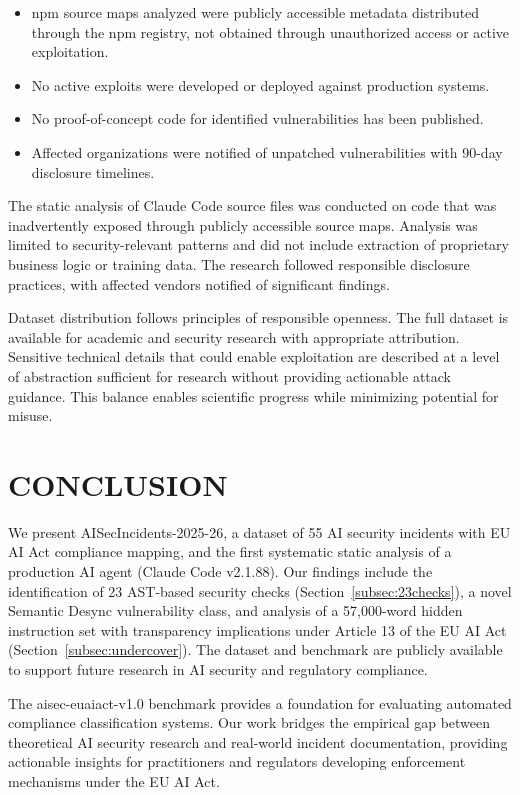\documentclass[10pt,conference]{IEEEtran}
\begin{document}
\begin{itemize}
    \item npm source maps analyzed were publicly accessible metadata distributed through the npm registry, not obtained through unauthorized access or active exploitation.
    \item No active exploits were developed or deployed against production systems.
    \item No proof-of-concept code for identified vulnerabilities has been published.
    \item Affected organizations were notified of unpatched vulnerabilities with 90-day disclosure timelines.
\end{itemize}

The static analysis of Claude Code source files was conducted on code that was inadvertently exposed through publicly accessible source maps. Analysis was limited to security-relevant patterns and did not include extraction of proprietary business logic or training data. The research followed responsible disclosure practices, with affected vendors notified of significant findings.

Dataset distribution follows principles of responsible openness. The full dataset is available for academic and security research with appropriate attribution. Sensitive technical details that could enable exploitation are described at a level of abstraction sufficient for research without providing actionable attack guidance. This balance enables scientific progress while minimizing potential for misuse.

\section{CONCLUSION}
\label{sec:conclusion}

We present AISecIncidents-2025-26, a dataset of 55 AI security incidents with EU AI Act compliance mapping, and the first systematic static analysis of a production AI agent (Claude Code v2.1.88). Our findings include the identification of 23 AST-based security checks (Section~\ref{subsec:23checks}), a novel Semantic Desync vulnerability class, and analysis of a 57,000-word hidden instruction set with transparency implications under Article 13 of the EU AI Act (Section~\ref{subsec:undercover}). The dataset and benchmark are publicly available to support future research in AI security and regulatory compliance.

The aisec-euaiact-v1.0 benchmark provides a foundation for evaluating automated compliance classification systems. Our work bridges the empirical gap between theoretical AI security research and real-world incident documentation, providing actionable insights for practitioners and regulators developing enforcement mechanisms under the EU AI Act.
\end{document}
